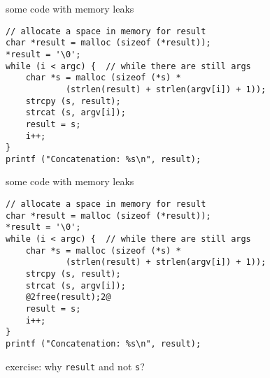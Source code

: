 \begin{frame}[fragile,label=memLeakCode]{some code with memory leaks}
\lstset{language=C++,style=smaller}
\begin{lstlisting}
// allocate a space in memory for result
char *result = malloc (sizeof (*result));
*result = '\0';
while (i < argc) {  // while there are still args
    char *s = malloc (sizeof (*s) *
            (strlen(result) + strlen(argv[i]) + 1));
    strcpy (s, result);
    strcat (s, argv[i]);
    result = s;
    i++;
}
printf ("Concatenation: %s\n", result);
\end{lstlisting}
\end{frame}


\begin{frame}[fragile,label=memLeakCode]{some code with memory leaks}
\begin{lstlisting}
// allocate a space in memory for result
char *result = malloc (sizeof (*result));
*result = '\0';
while (i < argc) {  // while there are still args
    char *s = malloc (sizeof (*s) *
            (strlen(result) + strlen(argv[i]) + 1));
    strcpy (s, result);
    strcat (s, argv[i]);
    @2free(result);2@
    result = s;
    i++;
}
printf ("Concatenation: %s\n", result);
\end{lstlisting}
exercise: why \texttt{result} and not \texttt{s}?
\end{frame}


